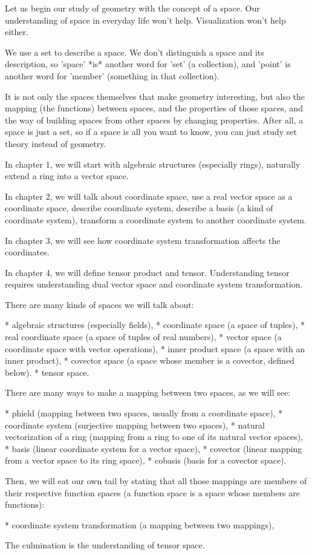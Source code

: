 Let us begin our study of geometry with the concept of a space.
Our understanding of space in everyday life won't help.
Visualization won't help either.

We use a set to describe a space.
We don't distinguish a space and its description,
so 'space' *is* another word for 'set' (a collection),
and 'point' is another word for 'member' (something in that collection).

It is not only the spaces themselves that make geometry interesting,
but also the mapping (the functions) between spaces,
and the properties of those spaces,
and the way of building spaces from other spaces by changing properties.
After all, a space is just a set,
so if a space is all you want to know,
you can just study set theory instead of geometry.

In chapter 1,
we will
start with algebraic structures (especially rings),
naturally extend a ring into a vector space.

In chapter 2,
we will talk about coordinate space,
use a real vector space as a coordinate space,
describe coordinate system,
describe a basis (a kind of coordinate system),
transform a coordinate system to another coordinate system.

In chapter 3,
we will see how coordinate system transformation affects the coordinates.

In chapter 4,
we will define tensor product and tensor.
Understanding tensor requires understanding
dual vector space and coordinate system transformation.

There are many kinds of spaces we will talk about:

* algebraic structures (especially fields),
* coordinate space (a space of tuples),
* real coordinate space (a space of tuples of real numbers),
* vector space (a coordinate space with vector operations),
* inner product space (a space with an inner product),
* covector space (a space whose member is a covector, defined below).
* tensor space.

There are many ways to make a mapping between two spaces,
as we will see:

* phield (mapping between two spaces, usually from a coordinate space),
* coordinate system (surjective mapping between two spaces),
* natural vectorization of a ring (mapping from a ring to one of its natural vector spaces),
* basis (linear coordinate system for a vector space),
* covector (linear mapping from a vector space to its ring space),
* cobasis (basis for a covector space).

Then, we will eat our own tail by stating that all those mappings are members of their respective function spaces
(a function space is a space whose members are functions):

* coordinate system transformation (a mapping between two mappings),

The culmination is the understanding of tensor space.
